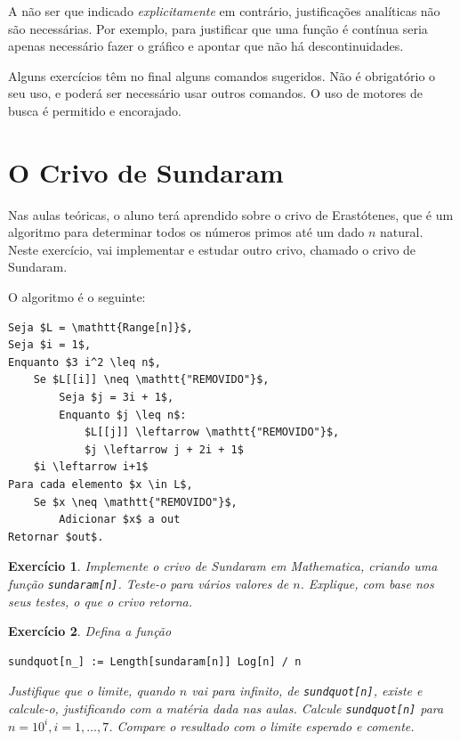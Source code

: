 \documentclass{article}
\newtheorem{ex}{Exercício}[section]
\begin{document}
\smallskip

A não ser que indicado \emph{explicitamente} em contrário, justificações analíticas não são necessárias. Por exemplo, para justificar que uma função é contínua seria apenas necessário fazer o gráfico e apontar que não há descontinuidades.

\smallskip

Alguns exercícios têm no final alguns comandos sugeridos. Não é obrigatório o seu uso, e poderá ser necessário usar outros comandos. O uso de motores de busca é permitido e encorajado.

\section{O Crivo de Sundaram}

Nas aulas teóricas, o aluno terá aprendido sobre o crivo de Erastótenes, que é um algoritmo para determinar todos os números primos até um dado $n$ natural. Neste exercício, vai implementar e estudar outro crivo, chamado o crivo de Sundaram.

O algoritmo é o seguinte:
\begin{lstlisting}[columns=fullflexible]
Seja $L = \mathtt{Range[n]}$,
Seja $i = 1$,
Enquanto $3 i^2 \leq n$,
	Se $L[[i]] \neq \mathtt{"REMOVIDO"}$,
		Seja $j = 3i + 1$,
		Enquanto $j \leq n$:
			$L[[j]] \leftarrow \mathtt{"REMOVIDO"}$,
			$j \leftarrow j + 2i + 1$
	$i \leftarrow i+1$
Para cada elemento $x \in L$,
	Se $x \neq \mathtt{"REMOVIDO"}$,
		Adicionar $x$ a out
Retornar $out$.
\end{lstlisting}

\begin{ex}
Implemente o crivo de Sundaram em Mathematica, criando uma função \texttt{sundaram[n]}. Teste-o para vários valores de $n$. Explique, com base nos seus testes, o que o crivo retorna.
\end{ex}


\begin{ex}
Defina a função
\begin{verbatim}
sundquot[n_] := Length[sundaram[n]] Log[n] / n
\end{verbatim}

Justifique que o limite, quando $n$ vai para infinito, de \texttt{sundquot[n]}, existe e calcule-o, justificando com a matéria dada nas aulas. Calcule \texttt{sundquot[n]} para $n = 10^i, i = 1, \dots, 7$. Compare o resultado com o limite esperado e comente.
\end{ex}
\end{document}
